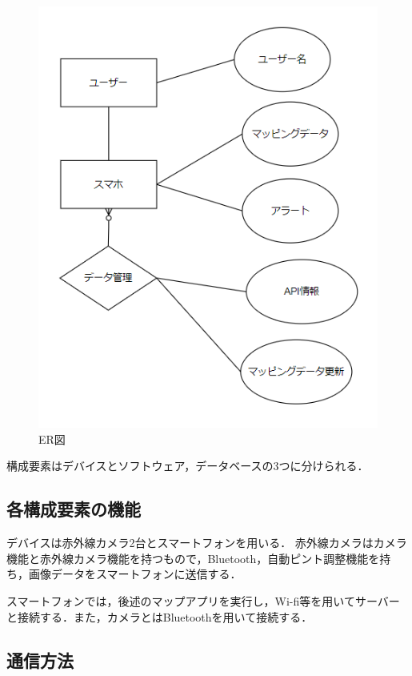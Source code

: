 \documentclass[titlepage,a4paper]{jsarticle}
\begin{document}
\begin{figure}[H]
  \centering
  \includegraphics[width=\textwidth]{img/ER_fig.png}
  \caption{ER図}
  \label{ER図}
\end{figure}

構成要素はデバイスとソフトウェア，データベースの3つに分けられる．
\subsection{各構成要素の機能}
デバイスは赤外線カメラ2台とスマートフォンを用いる．
赤外線カメラはカメラ機能と赤外線カメラ機能を持つもので，Bluetooth，自動ピント調整機能を持ち，画像データをスマートフォンに送信する．

スマートフォンでは，後述のマップアプリを実行し，Wi-fi等を用いてサーバーと接続する．また，カメラとはBluetoothを用いて接続する．


\subsection{通信方法}
\end{document}
